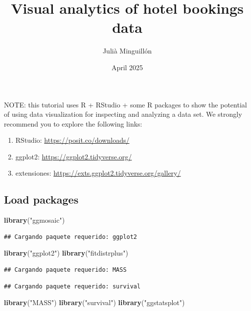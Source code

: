 \documentclass[
]{article}
\title{Visual analytics of hotel bookings data}
\author{Julià Minguillón}
\date{April 2025}
\newenvironment{Shaded}{\begin{snugshade}}{\end{snugshade}}
\newcommand{\FunctionTok}[1]{\textcolor[rgb]{0.13,0.29,0.53}{\textbf{#1}}}
\newcommand{\NormalTok}[1]{#1}
\newcommand{\StringTok}[1]{\textcolor[rgb]{0.31,0.60,0.02}{#1}}
\providecommand{\tightlist}{%
  \setlength{\itemsep}{0pt}\setlength{\parskip}{0pt}}
\begin{document}
\maketitle

NOTE: this tutorial uses R + RStudio + some R packages to show the
potential of using data visualization for inspecting and analyzing a
data set. We strongly recommend you to explore the following links:

\begin{enumerate}
\def\labelenumi{\arabic{enumi})}
\tightlist
\item
  RStudio: \url{https://posit.co/downloads/}
\item
  ggplot2: \url{https://ggplot2.tidyverse.org/}
\item
  extensiones: \url{https://exts.ggplot2.tidyverse.org/gallery/}
\end{enumerate}

\subsection{Load packages}\label{load-packages}

\begin{Shaded}
\begin{Highlighting}[]
\FunctionTok{library}\NormalTok{(}\StringTok{"ggmosaic"}\NormalTok{)}
\end{Highlighting}
\end{Shaded}

\begin{verbatim}
## Cargando paquete requerido: ggplot2
\end{verbatim}

\begin{Shaded}
\begin{Highlighting}[]
\FunctionTok{library}\NormalTok{(}\StringTok{"ggplot2"}\NormalTok{)}
\FunctionTok{library}\NormalTok{(}\StringTok{"fitdistrplus"}\NormalTok{)}
\end{Highlighting}
\end{Shaded}

\begin{verbatim}
## Cargando paquete requerido: MASS
\end{verbatim}

\begin{verbatim}
## Cargando paquete requerido: survival
\end{verbatim}

\begin{Shaded}
\begin{Highlighting}[]
\FunctionTok{library}\NormalTok{(}\StringTok{"MASS"}\NormalTok{)}
\FunctionTok{library}\NormalTok{(}\StringTok{"survival"}\NormalTok{)}
\FunctionTok{library}\NormalTok{(}\StringTok{"ggstatsplot"}\NormalTok{)}
\end{Highlighting}
\end{Shaded}
\end{document}
